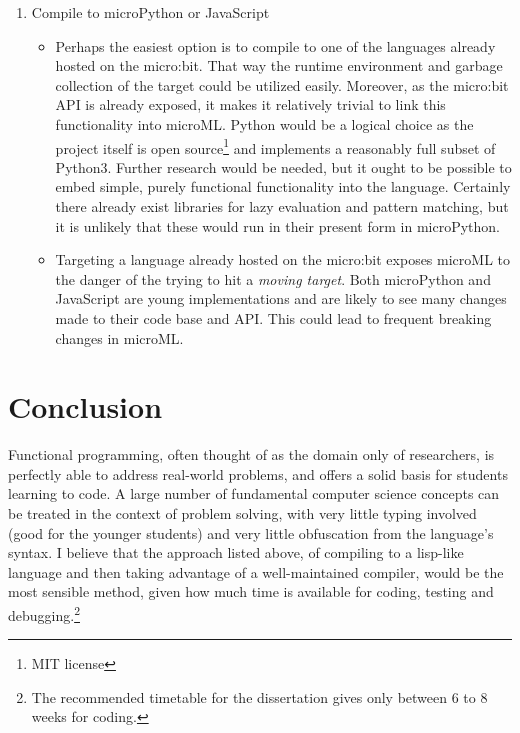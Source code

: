 \documentclass[11pt, a4paper]{article}
\begin{document}
\begin{enumerate}
    \item Compile to microPython or JavaScript
        \begin{itemize}
                \item Perhaps the easiest option is to compile to one of the languages already
                    hosted on the micro:bit. That way the runtime environment and garbage collection
                    of the target could be utilized easily. Moreover, as the micro:bit API is already
                    exposed, it makes it relatively trivial to link this functionality into microML.
                    Python would be a logical choice as the project itself is open source\footnote{MIT license}
                    and implements a reasonably full subset of Python3. Further research would be
                    needed, but it ought to be possible to embed simple, purely functional
                    functionality into the language. Certainly there already exist libraries for
                    lazy evaluation and pattern matching, but it is unlikely that these would run in
                    their present form in microPython. 
                \item Targeting a language already hosted on the micro:bit exposes microML to the
                    danger of the trying to hit a \textit{moving target}. Both microPython and 
                    JavaScript are young implementations and are likely to see many changes made 
                    to their code base and API. This could lead to frequent breaking changes in microML.
        \end{itemize}
\end{enumerate}

\section{Conclusion}
Functional programming, often thought of as the domain only of researchers, is perfectly able to
address real-world problems, and offers a solid basis for students learning to code. A large number
of fundamental computer science concepts can be treated in the context of problem solving, with very
little typing involved (good for the younger students) and very little obfuscation from the
language's syntax. I believe that the approach listed above, of compiling to a lisp-like language and
then taking advantage of a well-maintained compiler, would be the most sensible method, given how
much time is available for coding, testing and debugging.\footnote{The recommended timetable for the
    dissertation gives only between 6 to 8 weeks for coding.}
\end{document}
